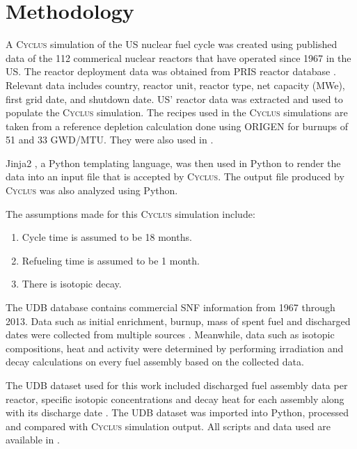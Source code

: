 \documentclass{anstrans}
\newcommand{\Cyclus}{\textsc{Cyclus}\xspace}%
\begin{document}
\section{Methodology}
A \Cyclus simulation of the \gls{US} nuclear fuel cycle was created using 
published data of the 112 commerical nuclear reactors that have operated since 
1967 in the \gls{US}. The reactor deployment data was obtained from \gls{PRIS} 
reactor database \cite{IAEA_pris_2017}.  Relevant data includes country, 
reactor unit, reactor type, net capacity (MWe), first grid date, and shutdown 
date. \gls{US}' reactor data was extracted and used to populate the \Cyclus 
simulation. The recipes used in the \Cyclus simulations are taken from a 
reference depletion calculation done using ORIGEN \cite{bell_origen_1973} for 
burnups of 51 and 33 GWD/MTU. They were also used in 
\cite{wilson_adoption_2009, bae_synergistic_2017}. 

Jinja2 \cite{ronacher_welcome_2018}, a Python templating language, was then 
used in Python to render the data into an input file that is accepted by 
\Cyclus. The output file produced by \Cyclus was also analyzed using Python. 

The assumptions made for this \Cyclus simulation include: 

\begin{enumerate}[topsep=0pt,itemsep=-1ex,partopsep=1ex,parsep=1ex]
	\item Cycle time is assumed to be 18 months. 
	\item Refueling time is assumed to be 1 month. 
	\item There is isotopic decay. 
\end{enumerate}

The \gls{UDB} database contains commercial \gls{SNF} information from 1967 through 2013. 
Data such as initial enrichment, burnup, mass of spent fuel and discharged 
dates were collected from multiple sources \cite{peterson_additional_2017}. 
Meanwhile, data such as isotopic compositions, heat and activity were determined 
by performing irradiation and decay calculations on every fuel assembly based 
on the collected data. 

The \gls{UDB} dataset used for this work included discharged fuel assembly data per 
reactor, specific isotopic concentrations and decay heat for each assembly 
along with its discharge date \cite{peterson_unf-st&dards_2017}. The \gls{UDB} 
dataset was imported into Python, processed and compared with \Cyclus 
simulation output. All scripts and data used are available in 
\cite{chee_arfc/transition-scenarios_2018}. 
\end{document}
